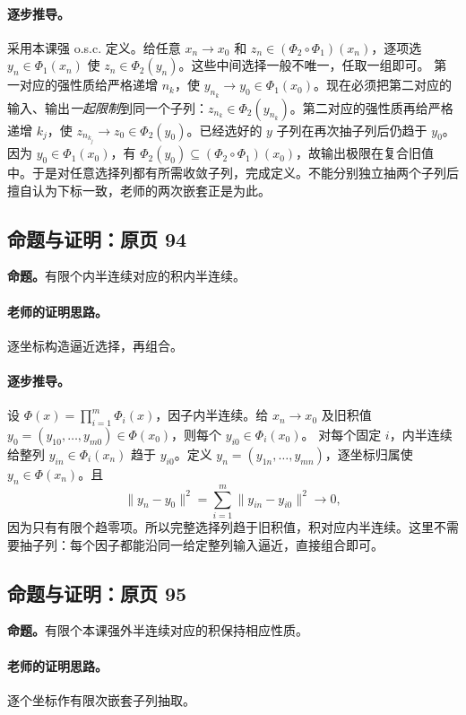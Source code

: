 \paragraph{逐步推导。}
采用本课强 o.s.c. 定义。给任意 $x_n\to x_0$ 和 $z_n\in(\Phi_2\circ\Phi_1)(x_n)$，逐项选 $y_n\in\Phi_1(x_n)$ 使 $z_n\in\Phi_2(y_n)$。这些中间选择一般不唯一，任取一组即可。
第一对应的强性质给严格递增 $n_k$，使 $y_{n_k}\to y_0\in\Phi_1(x_0)$。现在必须把第二对应的输入、输出\emph{一起限制}到同一个子列：$z_{n_k}\in\Phi_2(y_{n_k})$。第二对应的强性质再给严格递增 $k_j$，使 $z_{n_{k_j}}\to z_0\in\Phi_2(y_0)$。已经选好的 $y$ 子列在再次抽子列后仍趋于 $y_0$。
因为 $y_0\in\Phi_1(x_0)$，有 $\Phi_2(y_0)\subseteq(\Phi_2\circ\Phi_1)(x_0)$，故输出极限在复合旧值中。于是对任意选择列都有所需收敛子列，完成定义。不能分别独立抽两个子列后擅自认为下标一致，老师的两次嵌套正是为此。


\subsection{命题与证明：原页 94}

\textbf{命题。}有限个内半连续对应的积内半连续。

\paragraph{老师的证明思路。}逐坐标构造逼近选择，再组合。

\paragraph{逐步推导。}
设 $\Phi(x)=\prod_{i=1}^m\Phi_i(x)$，因子内半连续。给 $x_n\to x_0$ 及旧积值 $y_0=(y_{10},\ldots,y_{m0})\in\Phi(x_0)$，则每个 $y_{i0}\in\Phi_i(x_0)$。
对每个固定 $i$，内半连续给整列 $y_{in}\in\Phi_i(x_n)$ 趋于 $y_{i0}$。定义 $y_n=(y_{1n},\ldots,y_{mn})$，逐坐标归属使 $y_n\in\Phi(x_n)$。且
\[\|y_n-y_0\|^2=\sum_{i=1}^m\|y_{in}-y_{i0}\|^2\to0,\]
因为只有有限个趋零项。所以完整选择列趋于旧积值，积对应内半连续。这里不需要抽子列：每个因子都能沿同一给定整列输入逼近，直接组合即可。


\subsection{命题与证明：原页 95}

\textbf{命题。}有限个本课强外半连续对应的积保持相应性质。

\paragraph{老师的证明思路。}逐个坐标作有限次嵌套子列抽取。


